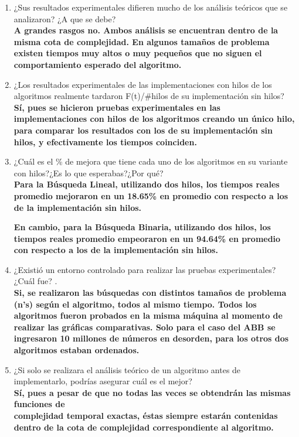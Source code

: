 \documentclass[12pt]{article}
\begin{document}
\begin{enumerate}
			        \item ¿Sus resultados experimentales difieren mucho de los análisis teóricos que se analizaron? ¿A que se debe?\\
			        \textbf{A grandes rasgos no. Ambos análisis se encuentran dentro de la misma cota de complejidad. En algunos tamaños de problema existen tiempos muy altos o muy pequeños que no siguen el comportamiento esperado del algoritmo.}
			        
			        \item ¿Los resultados experimentales de las implementaciones con hilos de los algoritmos realmente tardaron F(t)/#hilos de su implementación sin hilos?\\
			        \textbf{Sí, pues se hicieron pruebas experimentales en las implementaciones con hilos de los algoritmos creando un único hilo, para comparar los resultados con los de su implementación sin hilos, y efectivamente los tiempos coinciden.}
			        
			        \item ¿Cuál es el \% de mejora que tiene cada uno de los algoritmos en su variante con hilos?¿Es lo que esperabas?¿Por qué?\\
			        \textbf{Para la Búsqueda Lineal, utilizando dos hilos, los tiempos reales promedio mejoraron en un 18.65\% en promedio con respecto a los de la implementación sin hilos.}
			        
			        \textbf{En cambio, para la Búsqueda Binaria, utilizando dos hilos, los tiempos reales promedio empeoraron en un 94.64\% en promedio con respecto a los de la implementación sin hilos.}
			        
			        \item ¿Existió un entorno controlado para realizar las pruebas experimentales?¿Cuál fue?
			        .\\
			         \textbf{Si, se realizaron las búsquedas con distintos tamaños de problema (n's) según el algoritmo, todos al mismo tiempo. Todos los algoritmos fueron probados en la misma máquina al momento de realizar las gráficas comparativas. Solo para el caso del ABB se ingresaron 10 millones de números en desorden, para los otros dos algoritmos estaban ordenados.}
			        
			        \item ¿Si solo se realizara el análisis teórico de un algoritmo antes de implementarlo, podrías asegurar cuál es el mejor?\\
			        \textbf{Sí, pues a pesar de que no todas las veces se obtendrán las mismas funciones de \\complejidad temporal exactas, éstas siempre estarán contenidas dentro de la cota de complejidad correspondiente al algoritmo.}
			        

\end{enumerate}
\end{document}
